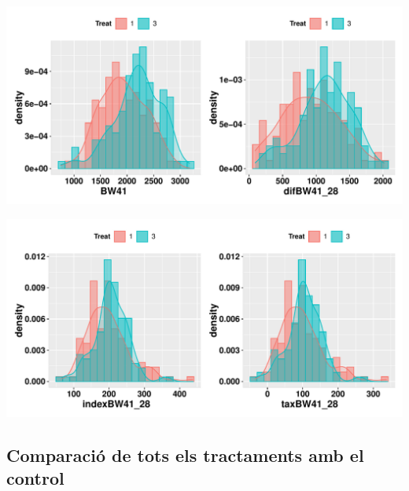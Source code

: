 \documentclass[11pt,a4paper]{article}\usepackage[]{graphicx}\usepackage[]{color}
\makeatletter
\def\maxwidth{ %
  \ifdim\Gin@nat@width>\linewidth
    \linewidth
  \else
    \Gin@nat@width
  \fi
}
\newenvironment{knitrout}{}{} %
\makeatother
\begin{document}
\begin{knitrout}
\color{fgcolor}
\includegraphics[width=\maxwidth]{figure/unnamed-chunk-9-1} 

\includegraphics[width=\maxwidth]{figure/unnamed-chunk-9-2} 

\end{knitrout}

\clearpage
\subsection{Comparació de tots els tractaments amb el control}
\end{document}
